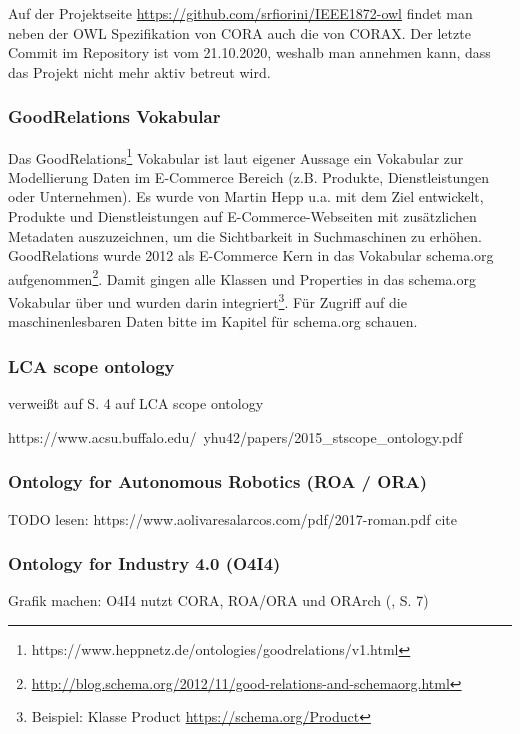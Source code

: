 \documentclass{article}
\begin{document}
Auf der Projektseite \url{https://github.com/srfiorini/IEEE1872-owl} findet man neben der OWL Spezifikation von CORA auch die von CORAX. Der letzte Commit im Repository ist vom 21.10.2020, weshalb man annehmen kann, dass das Projekt nicht mehr aktiv betreut wird.

\subsubsection{GoodRelations Vokabular}

Das GoodRelations\footnote{https://www.heppnetz.de/ontologies/goodrelations/v1.html} Vokabular ist laut eigener Aussage ein Vokabular zur Modellierung Daten im E-Commerce Bereich (z.B. Produkte, Dienstleistungen oder Unternehmen).
Es wurde von Martin Hepp u.a. mit dem Ziel entwickelt, Produkte und Dienstleistungen auf E-Commerce-Webseiten mit zusätzlichen Metadaten auszuzeichnen, um die Sichtbarkeit in Suchmaschinen zu erhöhen.
GoodRelations wurde 2012 als E-Commerce Kern in das Vokabular schema.org aufgenommen\footnote{\url{http://blog.schema.org/2012/11/good-relations-and-schemaorg.html}}.
Damit gingen alle Klassen und Properties in das schema.org Vokabular über und wurden darin integriert\footnote{Beispiel: Klasse Product \url{https://schema.org/Product}}.
Für Zugriff auf die maschinenlesbaren Daten bitte im Kapitel für schema.org schauen.

\subsubsection{LCA scope ontology}

\cite{vardem2015anminimal} verweißt auf S. 4 auf LCA scope ontology

https://www.acsu.buffalo.edu/~yhu42/papers/2015\_stscope\_ontology.pdf

\subsubsection{Ontology for Autonomous Robotics (ROA / ORA)}
TODO lesen: https://www.aolivaresalarcos.com/pdf/2017-roman.pdf
cite \cite{olszewska2017ontology}

\subsubsection{Ontology for Industry 4.0 (O4I4)}

\cite{kumar2019ontologies}

Grafik machen: O4I4 nutzt CORA, ROA/ORA und ORArch (\cite{kumar2019ontologies}, S. 7)
\end{document}
